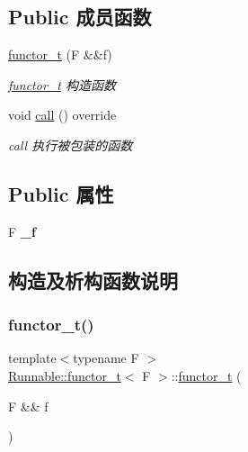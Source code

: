 \subsection*{Public 成员函数}
\begin{DoxyCompactItemize}
\item 
\hyperlink{structRunnable_1_1functor__t_a8125c5656f64c62ac856b0c4cbb2b1c6}{functor\+\_\+t} (F \&\&f)
\begin{DoxyCompactList}\small\item\em \hyperlink{structRunnable_1_1functor__t}{functor\+\_\+t} 构造函数 \end{DoxyCompactList}\item 
\mbox{\label{structRunnable_1_1functor__t_a404feeb85c1820746441eac72f511796}} 
void \hyperlink{structRunnable_1_1functor__t_a404feeb85c1820746441eac72f511796}{call} () override
\begin{DoxyCompactList}\small\item\em call 执行被包装的函数 \end{DoxyCompactList}\end{DoxyCompactItemize}
\subsection*{Public 属性}
\begin{DoxyCompactItemize}
\item 
\mbox{\label{structRunnable_1_1functor__t_a72162d31c1f95156de5b7cea5c481faf}} 
F {\bfseries \+\_\+f}
\end{DoxyCompactItemize}


\subsection{构造及析构函数说明}
\mbox{\label{structRunnable_1_1functor__t_a8125c5656f64c62ac856b0c4cbb2b1c6}} 
\subsubsection{\texorpdfstring{functor\+\_\+t()}{functor\_t()}}
{\footnotesize\ttfamily template$<$typename F $>$ \\
\hyperlink{structRunnable_1_1functor__t}{Runnable\+::functor\+\_\+t}$<$ F $>$\+::\hyperlink{structRunnable_1_1functor__t}{functor\+\_\+t} (\begin{DoxyParamCaption}\item[{F \&\&}]{f }\end{DoxyParamCaption})\hspace{0.3cm}{\ttfamily [inline]}}



